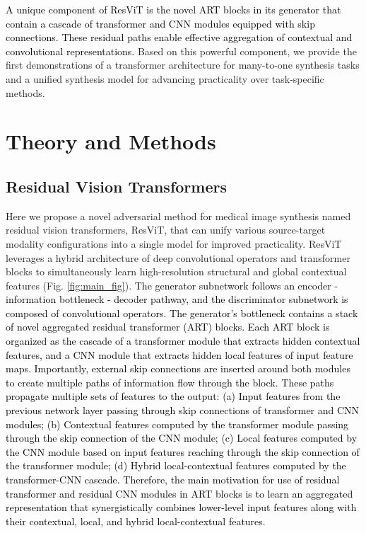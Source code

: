 \documentclass[journal,twoside,web]{ieeecolor}
\newcommand*{\revhl}{\textcolor{black}}
\begin{document}
\revhl{A unique component of ResViT is the novel ART blocks in its generator that contain a cascade of transformer and CNN modules equipped with skip connections. These residual paths enable effective aggregation of contextual and convolutional representations.} Based on this powerful component, we provide the first demonstrations of a transformer architecture for many-to-one synthesis tasks and a unified synthesis model for advancing practicality over task-specific methods. 

\section{Theory and Methods}
\subsection{Residual Vision Transformers}
Here we propose a novel adversarial method for medical image synthesis named residual vision transformers, ResViT, that can unify various source-target modality configurations into a single model for improved practicality. ResViT leverages a hybrid architecture of deep convolutional operators and transformer blocks to simultaneously learn high-resolution structural and global contextual features (Fig. \ref{fig:main_fig}). \revhl{The generator subnetwork follows an encoder - information bottleneck - decoder pathway, and the discriminator subnetwork is composed of convolutional operators. The generator's bottleneck contains a stack of novel aggregated residual transformer (ART) blocks. Each ART block is organized as the cascade of a transformer module that extracts hidden contextual features, and a CNN module that extracts hidden local features of input feature maps. Importantly, external skip connections are inserted around both modules to create multiple paths of information flow through the block. These paths propagate multiple sets of features to the output: (a) Input features from the previous network layer passing through skip connections of transformer and CNN modules; (b) Contextual features computed by the transformer module passing through the skip connection of the CNN module; (c) Local features computed by the CNN module based on input features reaching through the skip connection of the transformer module; (d) Hybrid local-contextual features computed by the transformer-CNN cascade. Therefore, the main motivation for use of residual transformer and residual CNN modules in ART blocks is to learn an aggregated representation that synergistically combines lower-level input features along with their contextual, local, and hybrid local-contextual features.} 
\end{document}
